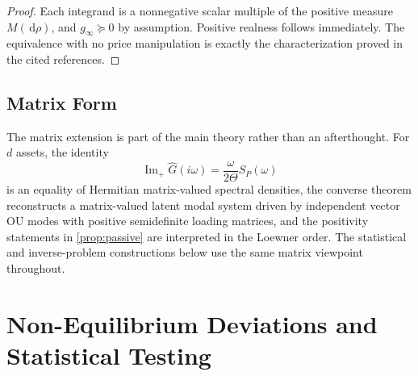 \documentclass[11pt]{article}
\newcommand{\Ghat}{\widehat{G}}
\newcommand{\ImPart}{\operatorname{Im}_{\!+}}
\newcommand{\dd}{\,\mathrm{d}}
\begin{document}
\begin{proof}
Each integrand is a nonnegative scalar multiple of the positive measure $M(\dd\rho)$, and $g_\infty\succeq 0$ by assumption. Positive realness follows immediately. The equivalence with no price manipulation is exactly the characterization proved in the cited references.
\end{proof}

\subsection{Matrix Form}
The matrix extension is part of the main theory rather than an afterthought. For $d$ assets, the identity
\[
  \ImPart \Ghat(i\omega)=\frac{\omega}{2\Theta}S_P(\omega)
\]
is an equality of Hermitian matrix-valued spectral densities, the converse theorem reconstructs a matrix-valued latent modal system driven by independent vector OU modes with positive semidefinite loading matrices, and the positivity statements in \cref{prop:passive} are interpreted in the Loewner order. The statistical and inverse-problem constructions below use the same matrix viewpoint throughout.

\section{Non-Equilibrium Deviations and Statistical Testing}\label{sec:testing}
\end{document}
